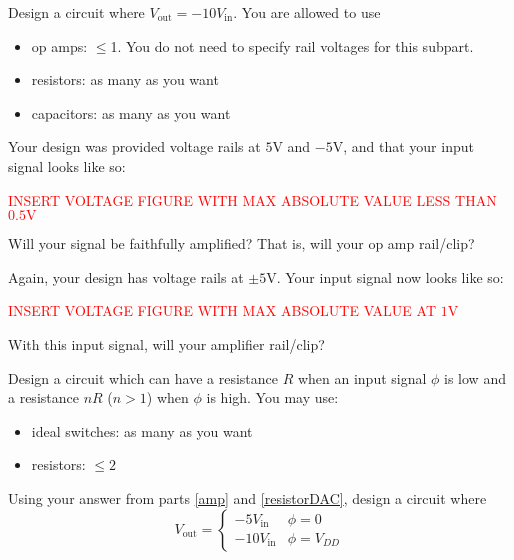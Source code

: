 
\begin{enumerate}
\qitem\label{amp}{
	Design a circuit where $V_\text{out} = -10V_\text{in}$. You are allowed to use
	\begin{itemize}
		\item op amps: $\leq$1. You do not need to specify rail voltages for this subpart.
		\item resistors: as many as you want
		\item capacitors: as many as you want
	\end{itemize}
}

\qitem\label{no_rail}{
	Your design was provided voltage rails at $5\si{\volt}$ and $-5\si{\volt}$, and that your input signal looks like so:
	\begin{center}
		\textcolor{red}{INSERT VOLTAGE FIGURE WITH MAX ABSOLUTE VALUE LESS THAN $0.5\si{\volt}$}
	\end{center}
	Will your signal be faithfully amplified? That is, will your op amp rail/clip?
}
\empt{\vspace{2cm}}

\qitem\label{yes_rail}{
	Again, your design has voltage rails at $\pm 5\si{\volt}$. Your input signal now looks like so:
	\begin{center}
		\textcolor{red}{INSERT VOLTAGE FIGURE WITH MAX ABSOLUTE VALUE AT $1\si{\volt}$}
	\end{center}
	With this input signal, will your amplifier rail/clip?
}
\empt{\vspace{2cm}}

\qitem\label{resistorDAC}{
	Design a circuit which can have a resistance $R$ when an input signal $\phi$ is low and a resistance $nR$ ($n > 1$) when $\phi$ is high. You may use:
	\begin{itemize}
		\item ideal switches: as many as you want
		\item resistors: $\leq 2$
	\end{itemize}
}
\empt{\vspace{4cm}}

\qitem\label{vga}{
	Using your answer from parts \ref{amp} and \ref{resistorDAC}, design a circuit where
	$$V_\text{out} = \begin{cases}
						-5V_\text{in} & \phi = 0\\
						-10V_\text{in} & \phi = V_{DD}
					\end{cases}$$
}
\empt{
	\vspace{2cm}

}
\end{enumerate}
